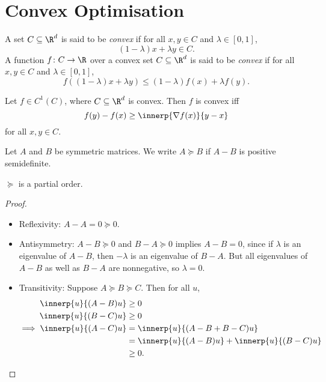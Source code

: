 \chapter{Convex Optimisation} \label{chp:convex}
\begin{definition} \label{def:convex}
    A set $C \subseteq \R^d$ is said to be \emph{convex} if for all
    $x, y \in C$ and $\lambda \in [0, 1]$, \[
        (1-\lambda)x + \lambda y \in C.
    \]
    A function $f\colon C \to \R$ over a convex set $C \subseteq \R^d$ is
    said to be \emph{convex} if for all $x, y \in C$ and
    $\lambda \in [0, 1]$, \[
        f((1-\lambda)x + \lambda y) \le (1-\lambda)f(x) + \lambda f(y).
    \]
\end{definition}

\begin{fact*}
    Let $f \in C^1(C)$, where $C \subseteq \R^d$ is convex.
    Then $f$ is convex iff \[
        f(y) - f(x) \ge \innerp{\nabla f(x)}{y-x}
    \] for all $x, y \in C$.
\end{fact*}

\begin{notation}
    Let $A$ and $B$ be symmetric matrices.
    We write $A \succeq B$ if $A - B$ is positive semidefinite.
\end{notation}
\begin{proposition}
    $\succeq$ is a partial order.
\end{proposition}
\begin{proof} \leavevmode
    \begin{itemize}
        \item Reflexivity: $A - A = 0 \succeq 0$.
        \item Antisymmetry: $A - B \succeq 0$ and $B - A \succeq 0$ implies
            $A - B = 0$, since if $\lambda$ is an eigenvalue of $A - B$,
            then $-\lambda$ is an eigenvalue of $B - A$.
            But all eigenvalues of $A - B$ as well as $B - A$ are
            nonnegative, so $\lambda = 0$.
        \item Transitivity: Suppose $A \succeq B \succeq C$.
        Then for all $u$,
        \begin{align*}
            \innerp{u}{(A - B)u} &\ge 0 \\
            \innerp{u}{(B - C)u} &\ge 0 \\
            \implies \innerp{u}{(A - C)u} &= \innerp{u}{(A - B + B - C)u} \\
            &= \innerp{u}{(A - B)u} + \innerp{u}{(B - C)u} \\
            &\ge 0. \qedhere
        \end{align*}
    \end{itemize}
\end{proof}

